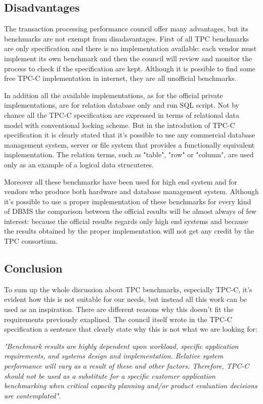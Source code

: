 		\subsection{Disadvantages}
The transaction processing performance council offer many advantages, but its benchmarks are not exempt from disadavantages. First of all TPC benchmarks are only specification and there is no implementation available: each vendor must implement its own benchmark and then the council will review and monitor the process to check if the specification are kept. Although it is possible to find some free TPC-C implementation in internet, they are all unofficial benchmarks.

In addition all the available implementations, as for the official private implementations, are for relation database only and run SQL script. Not by chance all the TPC-C specification are expressed in terms of relational data model with conventional locking scheme. But in the introdution of TPC-C specification \cite{TPC-C} it is clearly stated that it's possible to use any commercial database management system, server or file system that provides a functionally equivalent implementation. The relation terms, such as "table", "row" or "column", are used only as an example of a logical data strucuteres.

Moreover all these benchmarks have been used for high end system and for vendors who produce both hardware and database management system. Although it's possible to use a proper implementation of these benchmarks for every kind of DBMS the comparison between the official results will be almost always of few interest: because the official results regards only high end systems and because the results obtained by the proper implementation will not get any credit by the TPC consortium.

		\subsection{Conclusion}
To sum up the whole discussion about TPC benchmarks, especially TPC-C, it's evident how this is not suitable for our needs, but instead all this work can be used as an inspiration. There are different reasons why this doesn't fit the requirements previously exaplined. The council itself wrote in the TPC-C specification \cite{TPC-C} a sentence that clearly state why this is not what we are looking for:

\emph{"Benchmark results are highly dependent upon workload, specific application requirements, and systems design and implementation. Relative system performance will vary as a result of these and other factors. Therefore, TPC-C should not be used as a substitute for a specific customer application benchmarking when critical capacity planning and/or product evaluation decisions are contemplated"}.

